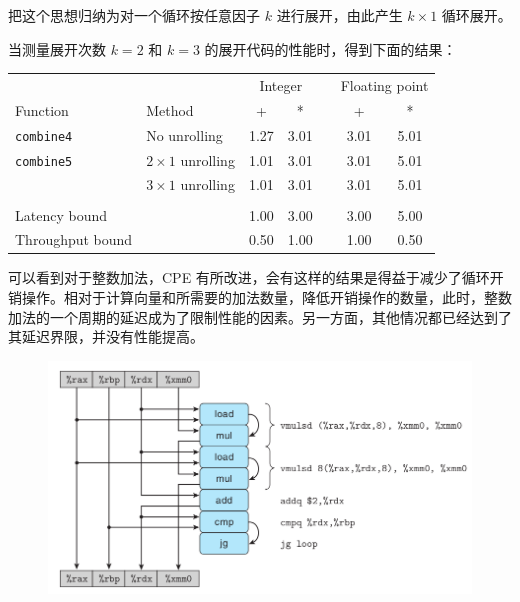 把这个思想归纳为对一个循环按任意因子 $k$ 进行展开，由此产生 $k \times 1$ 循环展开。

当测量展开次数 $k = 2$ 和 $k = 3$ 的展开代码的性能时，得到下面的结果：

\begin{table}[!ht]
    \centering
    \begin{tabular}{llccccc}
        \toprule
        & & \multicolumn{2}{c}{Integer} & & \multicolumn{2}{c}{Floating point} \\
        \cmidrule{3-4} \cmidrule{6-7}
        Function & Method & + & * & & + & * \\
        \midrule
        \texttt{combine4} & No unrolling & 1.27 & 3.01 & & 3.01 & 5.01 \\
        \texttt{combine5} & $2 \times 1$ unrolling & 1.01 & 3.01 & & 3.01 & 5.01 \\
                          & $3 \times 1$ unrolling & 1.01 & 3.01 & & 3.01 & 5.01 \\
        \\
        Latency bound & & 1.00 & 3.00 & & 3.00 & 5.00 \\
        Throughput bound & & 0.50 & 1.00 & & 1.00 & 0.50 \\
        \bottomrule
    \end{tabular}
\end{table}

可以看到对于整数加法，CPE 有所改进，会有这样的结果是得益于减少了循环开销操作。相对于计算向量和所需要的加法数量，降低开销操作的数量，此时，整数加法的一个周期的延迟成为了限制性能的因素。另一方面，其他情况都已经达到了其延迟界限，并没有性能提高。

\begin{figure}[!ht]
    \centering
    \includegraphics[scale=0.5]{img/5-5}
\end{figure}

